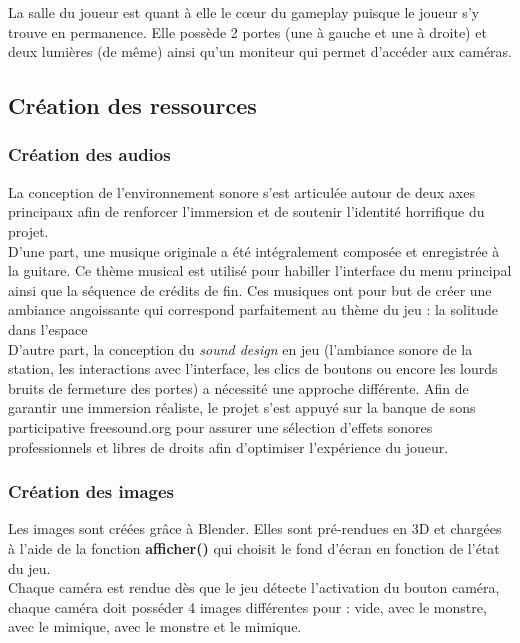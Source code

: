 \documentclass[11pt, a4paper]{article}
\begin{document}
La salle du joueur est quant à elle le cœur du gameplay puisque le joueur s'y trouve en permanence. Elle possède 2 portes (une à gauche et une à droite) et deux lumières (de même) ainsi qu'un moniteur qui permet d'accéder aux caméras.

\subsection{Création des ressources}
\subsubsection{Création des audios}

La conception de l'environnement sonore s'est articulée autour de deux axes principaux afin de renforcer l'immersion et de soutenir l'identité horrifique du projet. \\

D'une part, une musique originale a été intégralement composée et enregistrée à la guitare. Ce thème musical est utilisé pour habiller l'interface du menu principal ainsi que la séquence de crédits de fin. Ces musiques ont pour but de créer une ambiance angoissante qui correspond parfaitement au thème du jeu : la solitude dans l'espace \\

D'autre part, la conception du \textit{sound design} en jeu (l'ambiance sonore de la station, les interactions avec l'interface, les clics de boutons ou encore les lourds bruits de fermeture des portes) a nécessité une approche différente. Afin de garantir une immersion réaliste, le projet s'est appuyé sur la banque de sons participative freesound.org \cite{bib_freesound} pour assurer une sélection d'effets sonores professionnels et libres de droits afin d'optimiser l'expérience du joueur.

\newpage
\subsubsection{Création des images}

Les images sont créées grâce à Blender. Elles sont pré-rendues en 3D et chargées à l'aide de la fonction \textbf{afficher()} qui choisit le fond d'écran en fonction de l'état du jeu.\\

Chaque caméra est rendue dès que le jeu détecte l'activation du bouton caméra, chaque caméra doit posséder 4 images différentes pour : vide, avec le monstre, avec le mimique, avec le monstre et le mimique.
\end{document}
